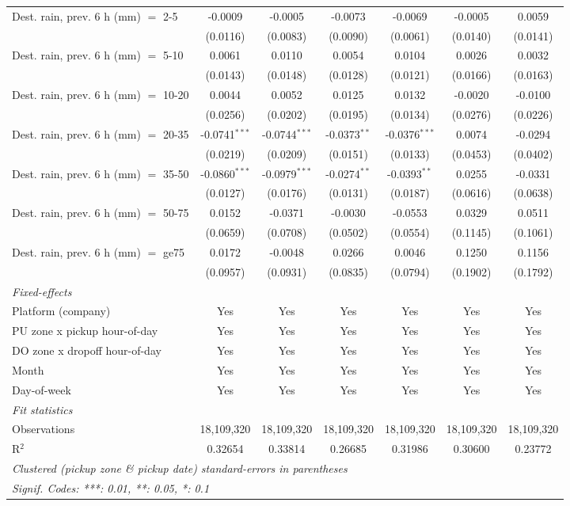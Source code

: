 \begin{tabular}{lcccccc}
   Dest. rain, prev. 6 h (mm) $=$ 2-5 & -0.0009 & -0.0005 & -0.0073 & -0.0069 & -0.0005 & 0.0059\\
    & (0.0116) & (0.0083) & (0.0090) & (0.0061) & (0.0140) & (0.0141)\\
   Dest. rain, prev. 6 h (mm) $=$ 5-10 & 0.0061 & 0.0110 & 0.0054 & 0.0104 & 0.0026 & 0.0032\\
    & (0.0143) & (0.0148) & (0.0128) & (0.0121) & (0.0166) & (0.0163)\\
   Dest. rain, prev. 6 h (mm) $=$ 10-20 & 0.0044 & 0.0052 & 0.0125 & 0.0132 & -0.0020 & -0.0100\\
    & (0.0256) & (0.0202) & (0.0195) & (0.0134) & (0.0276) & (0.0226)\\
   Dest. rain, prev. 6 h (mm) $=$ 20-35 & -0.0741$^{***}$ & -0.0744$^{***}$ & -0.0373$^{**}$ & -0.0376$^{***}$ & 0.0074 & -0.0294\\
    & (0.0219) & (0.0209) & (0.0151) & (0.0133) & (0.0453) & (0.0402)\\
   Dest. rain, prev. 6 h (mm) $=$ 35-50 & -0.0860$^{***}$ & -0.0979$^{***}$ & -0.0274$^{**}$ & -0.0393$^{**}$ & 0.0255 & -0.0331\\
    & (0.0127) & (0.0176) & (0.0131) & (0.0187) & (0.0616) & (0.0638)\\
   Dest. rain, prev. 6 h (mm) $=$ 50-75 & 0.0152 & -0.0371 & -0.0030 & -0.0553 & 0.0329 & 0.0511\\
    & (0.0659) & (0.0708) & (0.0502) & (0.0554) & (0.1145) & (0.1061)\\
   Dest. rain, prev. 6 h (mm) $=$ ge75 & 0.0172 & -0.0048 & 0.0266 & 0.0046 & 0.1250 & 0.1156\\
    & (0.0957) & (0.0931) & (0.0835) & (0.0794) & (0.1902) & (0.1792)\\
   \midrule
   \emph{Fixed-effects}\\
   Platform (company) & Yes & Yes & Yes & Yes & Yes & Yes\\
   PU zone x pickup hour-of-day & Yes & Yes & Yes & Yes & Yes & Yes\\
   DO zone x dropoff hour-of-day & Yes & Yes & Yes & Yes & Yes & Yes\\
   Month & Yes & Yes & Yes & Yes & Yes & Yes\\
   Day-of-week & Yes & Yes & Yes & Yes & Yes & Yes\\
   \midrule
   \emph{Fit statistics}\\
   Observations & 18,109,320 & 18,109,320 & 18,109,320 & 18,109,320 & 18,109,320 & 18,109,320\\
   R$^2$ & 0.32654 & 0.33814 & 0.26685 & 0.31986 & 0.30600 & 0.23772\\
   \midrule \midrule
   \multicolumn{7}{l}{\emph{Clustered (pickup zone \& pickup date) standard-errors in parentheses}}\\
   \multicolumn{7}{l}{\emph{Signif. Codes: ***: 0.01, **: 0.05, *: 0.1}}\\
\end{tabular}
 
